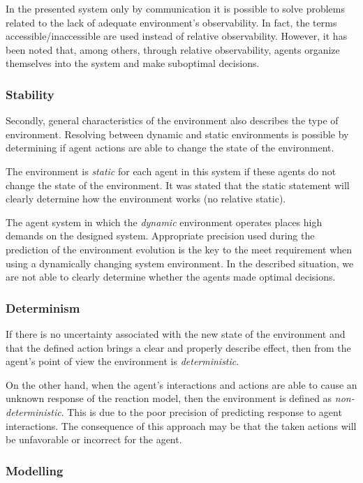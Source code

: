 In the presented system only by communication it is possible to solve problems related to the lack of adequate environment's observability. In fact, the terms accessible/inaccessible are used instead of relative observability. However, it has been noted that, among others, through relative observability, agents organize themselves into the system and make suboptimal decisions.

\subsubsection{Stability}

Secondly, general characteristics of the environment also describes the type of environment. Resolving between dynamic and static environments is possible by determining if agent actions are able to change the state of the environment.

The environment is \textit{static} for each agent in this system if these agents do not change the state of the environment. It was stated that the static statement will clearly determine how the environment works (no relative static).

The agent system in which the \textit{dynamic} environment operates places high demands on the designed system. Appropriate precision used during the prediction of the environment evolution is the key to the meet requirement when using a dynamically changing system environment. In the described situation, we are not able to clearly determine whether the agents made optimal decisions.

\subsubsection{Determinism}

If there is no uncertainty associated with the new state of the environment and that the defined action brings a clear and properly describe effect, then from the agent's point of view the environment is \textit{deterministic}.

On the other hand, when the agent's interactions and actions are able to cause an unknown response of the reaction model, then the environment is defined as \textit{non-deterministic}. This is due to the poor precision of predicting response to agent interactions. The consequence of this approach may be that the taken actions will be unfavorable or incorrect for the agent.

\subsubsection{Modelling}

